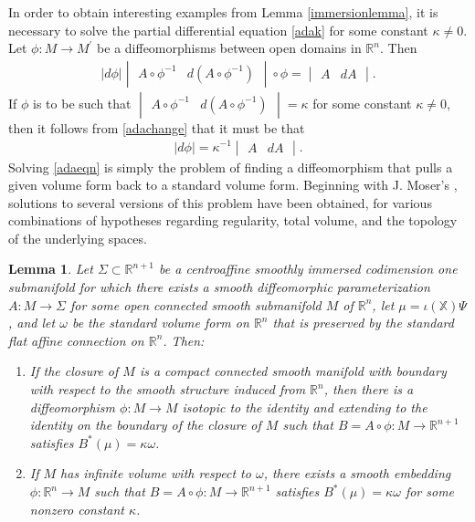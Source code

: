 \documentclass [leqno, 10pt]{amsart}
\newtheorem{lemma}[theorem]{Lemma}
\theoremstyle{definition}
\numberwithin{equation}{section}
\newcommand{\imt}{\iota}
\newcommand{\om}{\omega}
\newcommand{\ka}{\kappa}
\newcommand{\eul}{\mathbb{X}}
\newcommand{\rea}{\mathbb R}
\begin{document}
In order to obtain interesting examples from Lemma \ref{immersionlemma}, it is necessary to solve the partial differential equation \eqref{adak} for some constant $\ka \neq 0$. Let $\phi:M \to M^{\prime}$ be a diffeomorphisms between open domains in $\rea^{n}$. Then
\begin{align}\label{adachange}
|d\phi| \begin{vmatrix} A\circ \phi^{-1} & d(A\circ \phi^{-1}) \end{vmatrix} \circ \phi = \begin{vmatrix} A & dA \end{vmatrix}.
\end{align}
If $\phi$ is to be such that $\begin{vmatrix} A\circ \phi^{-1} & d(A\circ \phi^{-1}) \end{vmatrix} = \ka$ for some constant $\ka \neq 0$, then it follows from \eqref{adachange} that it must be that
\begin{align}\label{adaeqn}
|d\phi| = \ka^{-1} \begin{vmatrix} A & dA \end{vmatrix}.
\end{align}
Solving \eqref{adaeqn} is simply the problem of finding a diffeomorphism that pulls a given volume form back to a standard volume form. Beginning with J. Moser's \cite{Moser}, solutions to several versions of this problem have been obtained, for various combinations of hypotheses regarding regularity, total volume, and the topology of the underlying spaces. 

\begin{lemma}\label{deformationlemma}
Let $\Sigma \subset \rea^{n+1}$ be a centroaffine smoothly immersed codimension one submanifold for which there exists a smooth diffeomorphic parameterization $A:M \to \Sigma$ for some open connected smooth submanifold $M$ of $\rea^{n}$, let $\mu = \imt(\eul)\Psi$, and let $\om$ be the standard volume form on $\rea^{n}$ that is preserved by the standard flat affine connection on $\rea^{n}$. Then:
\begin{enumerate}
\item\label{banyagaclaim} If the closure of $M$ is a compact connected smooth manifold with boundary with respect to the smooth structure induced from $\rea^{n}$, then there is a diffeomorphism $\phi:M \to M$ isotopic to the identity and extending to the identity on the boundary of the closure of $M$ such that $B = A \circ \phi:M \to \rea^{n+1}$ satisfies $B^{\ast}(\mu) = \ka \om$.
\item\label{schlenkclaim} If $M$ has infinite volume with respect to $\om$, there exists a smooth embedding $\phi:\rea^{n} \to M$ such that $B = A \circ \phi:M \to \rea^{n+1}$ satisfies $B^{\ast}(\mu) = \ka \om$ for some nonzero constant $\ka$.
\end{enumerate}
\end{lemma}
\end{document}
